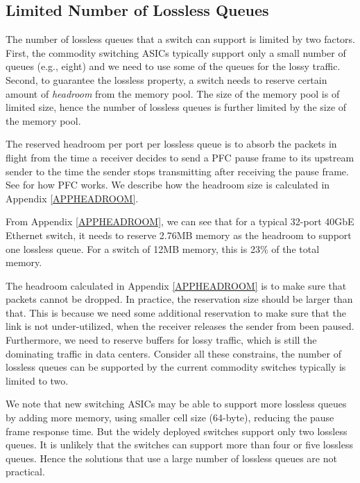 \subsection{Limited Number of Lossless Queues}\label{subsec:pfcheadroom}

The number of lossless queues that a switch can support is limited by two factors. First, the commodity switching ASICs typically support only a small number of queues (e.g., eight) and we need to use some of the queues for the lossy traffic. Second, to guarantee the lossless property, a switch needs to reserve certain amount of {\it headroom} from the memory pool. The size of the memory pool is of limited size, hence the number of lossless queues is further limited by the size of the memory pool.

The reserved headroom per port per lossless queue is to absorb the packets in flight from the time a receiver decides to send a PFC pause frame to its upstream sender to the time the sender stops transmitting after receiving the pause frame. See \cite{rdmaatscale} for how PFC works. We describe how the headroom size is calculated in Appendix \ref{APPHEADROOM}.

From Appendix \ref{APPHEADROOM}, we can see that for a typical 32-port 40GbE Ethernet switch, it needs to reserve 2.76MB memory as the headroom to support one lossless queue. For a switch of 12MB memory, this is 23\% of the total memory.

The headroom calculated in Appendix \ref{APPHEADROOM} is to make sure that packets cannot be dropped. In practice, the reservation size should be larger than that. This is because we need some additional reservation to make sure that the link is not under-utilized, when the receiver releases the sender from been paused. Furthermore, we need to reserve buffers for lossy traffic, which is still the dominating traffic in data centers. Consider all these constrains, the number of lossless queues can be supported by the current commodity switches typically is limited to two.

We note that new switching ASICs may be able to support more lossless queues by adding more memory, using smaller cell size (64-byte), reducing the pause frame response time. But the widely deployed switches support only two lossless queues. It is unlikely that the switches can support more than four or five lossless queues. Hence the solutions that use a large number of lossless queues are not practical. 



